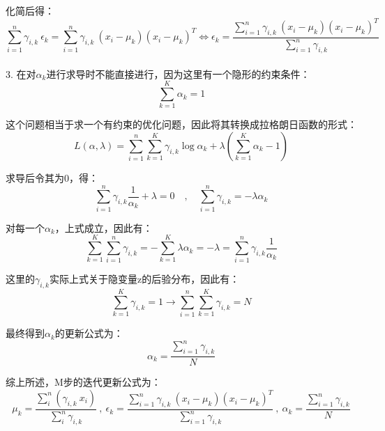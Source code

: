 \documentclass[12pt,a4paper]{article}
\begin{document}
\begin{spacing}{1.3}
\par 化简后得：
$$\sum\limits_{i=1}^{n} \gamma_{i,k}\ \epsilon_{k} = \sum\limits_{i=1}^{n} \gamma_{i,k}\ (x_{i}-\mu_{k})(x_{i}-\mu_{k})^{T}
\Longleftrightarrow \epsilon_{k} = \dfrac{\sum\limits_{i=1}^{n} \gamma_{i,k}\ (x_{i}-\mu_{k})(x_{i}-\mu_{k})^{T}}{\sum\limits_{i=1}^{n} \gamma_{i,k}}$$
\\3. 在对$\alpha_{k}$进行求导时不能直接进行，因为这里有一个隐形的约束条件：
$$\sum\limits_{k=1}^{K} \alpha_{k}=1 $$
\par 这个问题相当于求一个有约束的优化问题，因此将其转换成拉格朗日函数的形式：
$$L(\alpha,\lambda) = \sum\limits_{i=1}^{n}\sum\limits_{k=1}^{K} \gamma_{i,k} \log \alpha_{k} + \lambda(\sum\limits_{k=1}^{K} \alpha_{k} -1) $$
\par 求导后令其为0，得：
$$\sum\limits_{i=1}^{n} \gamma_{i,k} \dfrac{1}{\alpha_{k}} + \lambda = 0
\quad , \quad \sum\limits_{i=1}^{n} \gamma_{i,k}= -\lambda \alpha_{k}$$
\par 对每一个$\alpha_{k}$，上式成立，因此有：
$$\sum\limits_{k=1}^{K}\sum\limits_{i=1}^{n} \gamma_{i,k} =- \sum\limits_{k=1}^{K} \lambda \alpha_{k} = -\lambda = \sum\limits_{i=1}^{n} \gamma_{i,k} \dfrac{1}{\alpha_{k}}$$
\par 这里的$\gamma_{i,k}$实际上式关于隐变量z的后验分布，因此有：
$$ \sum\limits_{k=1}^{K} \gamma_{i,k} = 1 \longrightarrow \sum\limits_{i=1}^{n}\sum\limits_{k=1}^{K} \gamma_{i,k} = N$$
\par 最终得到$\alpha_{k}$的更新公式为：
$$\alpha_{k} = \dfrac{\sum\limits_{i=1}^{n} \gamma_{i,k}}{N} $$
\par 综上所述，M步的迭代更新公式为：
$$\mu_{k} = \dfrac{\sum\limits_{i}^{n} (\gamma_{i,k}\ x_{i})}{\sum\limits_{i}^{n} \gamma_{i,k}}
\ , \ \epsilon_{k}= \dfrac{\sum\limits_{i=1}^{n} \gamma_{i,k}\ (x_{i}-\mu_{k})(x_{i}-\mu_{k})^{T}}{\sum\limits_{i=1}^{n} \gamma_{i,k}}
\ , \  \alpha_{k} = \dfrac{\sum\limits_{i=1}^{n}\gamma_{i,k}}{N} $$

\end{spacing}
\end{document}
